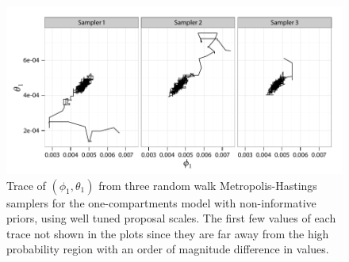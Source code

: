 \begin{figure}[t]
  \UseAltLinespread
  \includegraphics[width=\linewidth]{fig_src/PET_MH_Path.pdf}
  \caption[Traces of parameters in the random walk algorithm for the
  \protect\pet compartmental model (calibrated)]
  {Trace of $(\phi_1,\theta_1)$ from three random walk Metropolis-Hastings samplers for the one-compartments \pet model with non-informative priors, using well tuned proposal scales. The first few values of each trace  not shown in the plots since they are far away from the high probability region with an order of magnitude difference in values.}
  \label{fig:pet mh tuned}
\end{figure}

